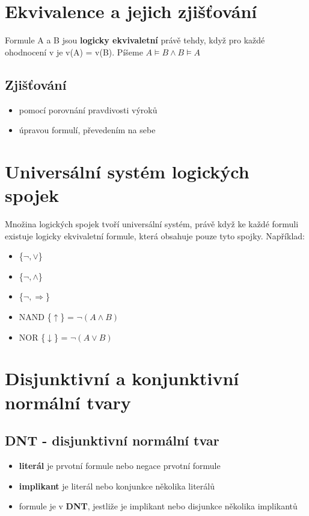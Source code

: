 \documentclass{szzclass}
\begin{document}
\section{Ekvivalence a jejich zjišťování}
Formule A a B jsou \textbf{logicky ekvivaletní} právě tehdy, když pro každé ohodnocení v je v(A) = v(B). Píšeme $A \models B \wedge B \models A$

\subsection{Zjišťování}
\begin{itemize}
	\item pomocí porovnání pravdivosti výroků
	\item úpravou formulí, převedením na sebe
\end{itemize}

\section{Universální systém logických spojek}
Množina logických spojek tvoří universální systém, právě když ke každé formuli existuje logicky ekvivaletní formule, která obsahuje pouze
tyto spojky. Například:
\begin{itemize}
	\item \{$\neg, \vee$\}
	\item \{$\neg, \wedge $\}
	\item \{$\neg, \Rightarrow$\}
	\item NAND \{$\uparrow$\} = $\neg(A \wedge B)$
	\item NOR \{$\downarrow$\} = $\neg(A \vee B)$
\end{itemize}
\section{Disjunktivní a konjunktivní normální tvary}
\subsection{DNT - disjunktivní normální tvar}
\begin{itemize}
	\item \textbf{literál} je prvotní formule nebo negace prvotní formule
	\item \textbf{implikant} je literál nebo konjunkce několika literálů
	\item formule je v \textbf{DNT}, jestliže je implikant nebo disjunkce několika implikantů 
\end{itemize}
\end{document}
